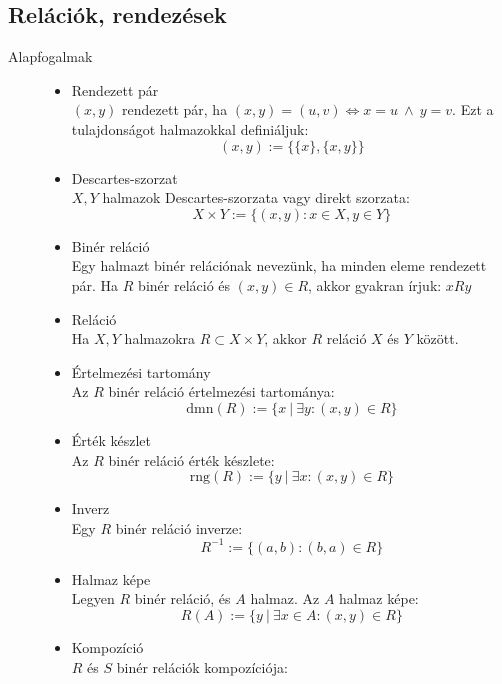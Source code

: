\documentclass[margin=0px]{article}
\begin{document}
\subsection{Relációk, rendezések}
\begin{description}
    \item[Alapfogalmak] \hfill
        \begin{itemize}
            \item Rendezett pár \\
                  $(x,y)$ rendezett pár, ha $(x,y) = (u,v) \Longleftrightarrow x = u \ \land \ y = v$. Ezt a tulajdonságot halmazokkal definiáljuk:
                  \[ (x,y) := \{ \{x\}, \{x, y\} \} \]
            \item Descartes-szorzat \\
                  $X,Y$ halmazok Descartes-szorzata vagy direkt szorzata:
                  \[ X \times Y := \{ (x,y) : x \in X, y \in Y \} \]
            \item Binér reláció \\
                  Egy halmazt binér relációnak nevezünk, ha minden eleme rendezett pár.
                  Ha $R$ binér reláció és $(x,y) \in R$, akkor gyakran írjuk: $xRy$
            \item Reláció \\
                  Ha $X,Y$ halmazokra $R \subset X\times Y$, akkor $R$ reláció $X$ és $Y$ között.
            \item Értelmezési tartomány \\
                  Az $R$ binér reláció értelmezési tartománya:
                  \[ \textrm{dmn}(R) := \{ x\  | \ \exists y : (x,y)\in R  \}\]
            \item Érték készlet \\
                  Az $R$ binér reláció érték készlete:
                  \[ \textrm{rng}(R) := \{ y\  | \ \exists x : (x,y)\in R  \}\]
            \item Inverz \\
                  Egy $R$ binér reláció inverze:
                  \[R^{-1} := \{(a,b) : (b,a) \in R\} \]
            \item Halmaz képe \\
                  Legyen $R$ binér reláció, és $A$ halmaz. Az $A$ halmaz képe:
                  \[R(A) := \{y \ | \ \exists x\in A: (x,y) \in R\} \]
            \item Kompozíció \\
                  $R$ és $S$ binér relációk kompozíciója:

\end{itemize}
\end{description}
\end{document}
